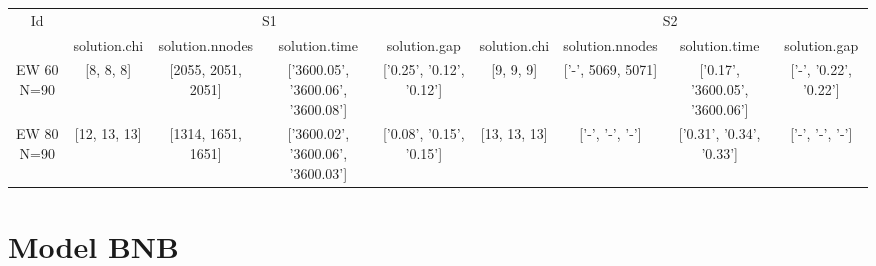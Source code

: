 \documentclass[landscape, 12pt]{report}
\begin{document}
\begin{tabular}{|c|cccc|cccc|}
\hline
\multicolumn{1}{|c|}{Id} & \multicolumn{4}{|c|}{S1} & \multicolumn{4}{|c|}{S2}
\\
 & solution.chi & solution.nnodes & solution.time & solution.gap & solution.chi & solution.nnodes & solution.time & solution.gap
\\
\hline
EW 60 N=90 & [8, 8, 8] & [2055, 2051, 2051] & ['3600.05', '3600.06', '3600.08'] & ['0.25', '0.12', '0.12'] & [9, 9, 9] & ['-', 5069, 5071] & ['0.17', '3600.05', '3600.06'] & ['-', '0.22', '0.22']
\\
EW 80 N=90 & [12, 13, 13] & [1314, 1651, 1651] & ['3600.02', '3600.06', '3600.03'] & ['0.08', '0.15', '0.15'] & [13, 13, 13] & ['-', '-', '-'] & ['0.31', '0.34', '0.33'] & ['-', '-', '-']
\\
\hline 
 \end{tabular}




	
	\clearpage
	
	\section{Model BNB}
	
\end{document}
